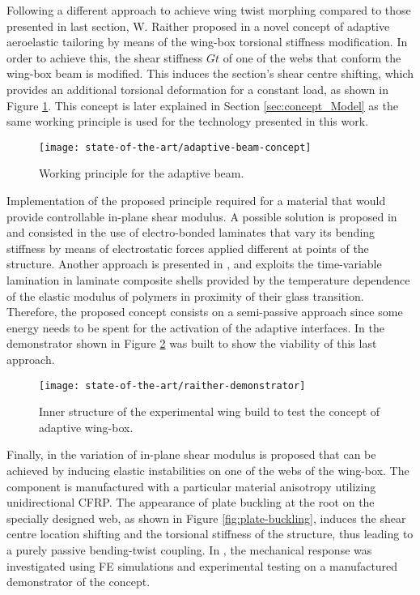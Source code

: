   Following a different approach to achieve wing twist morphing compared to those presented in last section, W. Raither proposed in \cite{Raither2013a} a novel concept of adaptive aeroelastic tailoring by means of the wing-box torsional stiffness modification. In order to achieve this, the shear stiffness $G t$ of one of the webs that conform the wing-box beam is modified. This induces the section's shear centre shifting, which provides an additional torsional deformation for a constant load, as shown in Figure \ref{fig:adaptive-beam-concept}. This concept is later explained in Section \ref{sec:concept_Model} as the same working principle is used for the technology presented in this work.

  \begin{figure}[!htpb]
    \centering
    \texttt{[image: state-of-the-art/adaptive-beam-concept]}
    \caption[Working principle for the adaptive beam]{Working principle for the adaptive beam. \cite{Raither2013}}\label{fig:adaptive-beam-concept}
  \end{figure} 

  Implementation of the proposed principle required for a material that would provide controllable in-plane shear modulus. A possible solution is proposed in \cite{Bergamini2006} and consisted in the use of electro-bonded laminates that vary its bending stiffness by means of electrostatic forces applied different at points of the structure. Another approach is presented in \cite{Raither2012}, and exploits the time-variable lamination in laminate composite shells provided by the temperature dependence of the elastic modulus of polymers in proximity of their glass transition. Therefore, the proposed concept consists on a semi-passive approach since some energy needs to be spent for the activation of the adaptive interfaces. In \cite{Raither2013} the demonstrator shown in Figure \ref{fig:raither-demonstrator} was built to show the viability of this last approach.

  \begin{figure}[!htpb]
    \centering
    \texttt{[image: state-of-the-art/raither-demonstrator]}
    \caption[Inner structure of the experimental wing build to test the concept of adaptive wing-box]{Inner structure of the experimental wing build to test the concept of adaptive wing-box. \cite{Raither2013}}\label{fig:raither-demonstrator}
  \end{figure}

  Finally, in \cite{Runkel2016} the variation of in-plane shear modulus is proposed that can be achieved by inducing elastic instabilities on one of the webs of the wing-box. The component is manufactured with a particular material anisotropy utilizing unidirectional CFRP. The appearance of plate buckling at the root on the specially designed web, as shown in Figure \ref{fig:plate-buckling}, induces the shear centre location shifting and the torsional stiffness of the structure, thus leading to a purely passive bending-twist coupling. In \cite{Andreas2015}, the mechanical response was investigated using FE simulations and experimental testing on a manufactured demonstrator of the concept.

